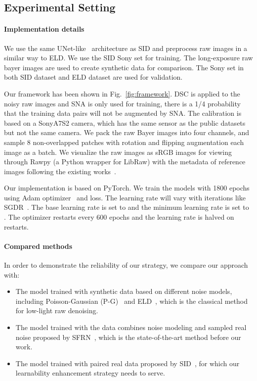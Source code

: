 \documentclass[sigconf,screen,nonacm]{acmart}
\begin{document}
  \subsection{Experimental Setting} \label{subsec:setting}
    \paragraph{\textbf{Implementation details}}
    We use the same UNet-like~\cite{Unet} architecture as SID and preprocess raw images in a similar way to ELD.
We use the SID Sony set for training. The long-exposure raw bayer images are used to create synthetic data for comparison.
    The Sony set in both SID dataset and ELD dataset are used for validation.

    Our framework has been shown in Fig.~\ref{fig:framework}. DSC is applied to the noisy raw images and SNA is only used for training, there is a 1/4 probability that the training data pairs will not be augmented by SNA. The calibration is based on a SonyA7S2 camera, which has the same sensor as the public datasets but not the same camera.
    We pack the raw Bayer images into four channels, and sample 8 non-overlapped  patches with rotation and flipping augmentation each image as a batch. We visualize the raw images as sRGB images for viewing through Rawpy (a Python wrapper for LibRaw) with the metadata of reference images following the existing works~\cite{CVPR18/SID, TPAMI21/ELD}.




    Our implementation is based on PyTorch.
We train the models with 1800 epochs using Adam optimizer~\cite{Adam} and  loss. The learning rate will vary with iterations like SGDR~\cite{ICLR17/SGDR}. The base learning rate is set to  and the minimum learning rate is set to . The optimizer restarts every 600 epochs and the learning rate is halved on restarts.

    \paragraph{\textbf{Compared methods}}
    In order to demonstrate the reliability of our strategy, we compare our approach with:
    \begin{itemize}[leftmargin=*]
        \item The model trained with synthetic data based on different noise models, including Poisson-Gaussian (P-G)~\cite{P-G} and ELD~\cite{TPAMI21/ELD}, which is the classical method for low-light raw denoising.

        \item The model trained with the data combines noise modeling and sampled real noise proposed by SFRN~\cite{ICCV21/SFRN}, which is the state-of-the-art method before our work.

        \item The model trained with paired real data proposed by SID~\cite{CVPR18/SID}, for which our learnability enhancement strategy needs to serve.
    \end{itemize}
\end{document}
